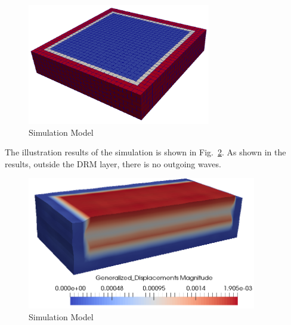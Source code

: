 \begin{figure}[H]
  \centering
  \includegraphics[width = 8cm]{./Figure-files/Day2/Deconvolution_3by1D_Motions/Free_fields_3D_model_with_DRM/overview.png}
  \caption{Simulation Model}
  \label{fig_decon_3by1D_motion_3D_model}
\end{figure}

The illustration results of the simulation is shown in Fig.~\ref{fig_decon_3D_motion_3D_model_results_free_field}.
As shown in the results, outside the DRM layer, there is no outgoing waves. 

\begin{figure}[H]
  \centering
  \includegraphics[width = 10cm]{./Figure-files/Day2/Deconvolution_3by1D_Motions/Free_fields_3D_model_with_DRM/motion3D_DRM3D_free_field.png}
  \caption{Simulation Model}
  \label{fig_decon_3D_motion_3D_model_results_free_field}
\end{figure}



